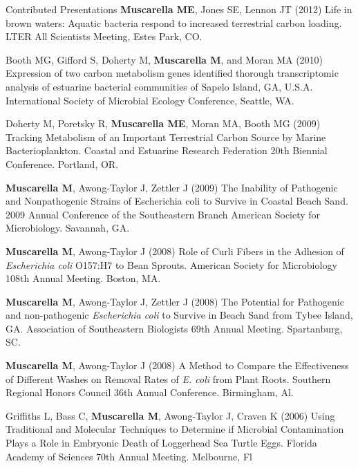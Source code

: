 \documentclass{resume} %
\begin{document}
\begin{rSection}{Contributed Presentations}
  {\bf Muscarella ME}, Jones SE, Lennon JT (2012) Life in brown waters: Aquatic
  bacteria respond to increased terrestrial carbon loading. LTER All Scientists
  Meeting, Estes Park, CO.

  Booth MG, Gifford S, Doherty M, {\bf Muscarella M}, and Moran MA (2010)
  Expression of two carbon metabolism genes identified thorough transcriptomic
  analysis of estuarine bacterial communities of Sapelo Island, GA, U.S.A.
  International Society of Microbial Ecology Conference, Seattle, WA.

  Doherty M, Poretsky R, {\bf Muscarella ME}, Moran MA, Booth MG (2009) Tracking
  Metabolism of an Important Terrestrial Carbon Source by Marine
  Bacterioplankton. Coastal and Estuarine Research Federation 20th Biennial
  Conference. Portland, OR.

  {\bf Muscarella M}, Awong-Taylor J, Zettler J (2009) The Inability of
  Pathogenic and Nonpathogenic Strains of Escherichia coli to Survive in Coastal
  Beach Sand. 2009 Annual Conference of the Southeastern Branch American Society
  for Microbiology. Savannah, GA.

  {\bf Muscarella M}, Awong-Taylor J (2008) Role of Curli Fibers in the Adhesion
  of \emph{Escherichia coli} O157:H7 to Bean Sprouts. American Society for Microbiology
  108th Annual Meeting. Boston, MA.

  {\bf Muscarella M}, Awong-Taylor J, Zettler J (2008) The Potential for
  Pathogenic and non-pathogenic \emph{Escherichia coli} to Survive in Beach Sand from
  Tybee Island, GA. Association of Southeastern Biologists 69th Annual Meeting.
  Spartanburg, SC.

  {\bf Muscarella M}, Awong-Taylor J (2008) A Method to Compare the
  Effectiveness of Different Washes on Removal Rates of \emph{E. coli} from Plant
  Roots. Southern Regional Honors Council 36th Annual Conference. Birmingham,
  Al.

  Griffiths L, Bass  C, {\bf Muscarella M}, Awong-Taylor J, Craven K (2006)
  Using Traditional and Molecular Techniques to Determine if Microbial
  Contamination Plays a Role in Embryonic Death of Loggerhead Sea Turtle Eggs.
  Florida Academy of Sciences 70th Annual Meeting. Melbourne, Fl

\end{rSection}
\end{document}
